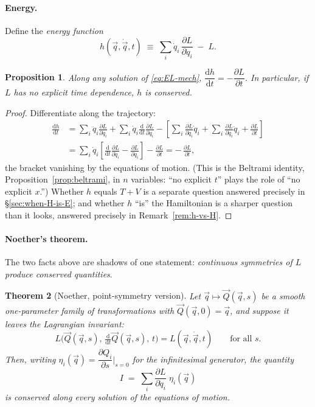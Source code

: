 \documentclass[11pt]{article}
\theoremstyle{plain}
\newtheorem{theorem}{Theorem}[section]
\newtheorem{proposition}[theorem]{Proposition}
\theoremstyle{definition}
\theoremstyle{remark}
\newcommand{\dd}{\mathrm{d}}
\newcommand{\pd}[2]{\frac{\partial #1}{\partial #2}}
\newcommand{\vq}{\vec{q}}
\begin{document}
\paragraph{Energy.}
Define the \emph{energy function}
\begin{equation}
  \boxed{\;
  h(\vq, \dot\vq, t) \;\equiv\; \sum_i \dot q_i\,\pd{L}{\dot q_i} \;-\; L .
  \;}
\end{equation}
\begin{proposition}\label{prop:energy}
Along any solution of \eqref{eq:EL-mech},
$\dfrac{\dd h}{\dd t} = -\dfrac{\partial L}{\partial t}$.
In particular, if $L$ has no explicit time dependence, $h$ is conserved.
\end{proposition}
\begin{proof}
Differentiate along the trajectory:
\begin{align}
  \frac{\dd h}{\dd t}
  &= \sum_i \ddot q_i \pd{L}{\dot q_i}
   + \sum_i \dot q_i \frac{\dd}{\dd t}\pd{L}{\dot q_i}
   - \left[\sum_i \pd{L}{q_i}\dot q_i
   + \sum_i \pd{L}{\dot q_i}\ddot q_i + \pd{L}{t}\right] \nonumber\\
  &= \sum_i \dot q_i\left[\frac{\dd}{\dd t}\pd{L}{\dot q_i}
     - \pd{L}{q_i}\right] - \pd{L}{t}
   = -\,\pd{L}{t},
\end{align}
the bracket vanishing by the equations of motion. (This is the Beltrami
identity, Proposition~\ref{prop:beltrami}, in $n$ variables: ``no explicit
$t$'' plays the role of ``no explicit $x$.'') Whether $h$ equals $T + V$
is a separate question answered precisely in \S\ref{sec:when-H-is-E};
and whether $h$ ``is'' the Hamiltonian is a sharper question than it
looks, answered precisely in Remark~\ref{rem:h-vs-H}.
\end{proof}

\paragraph{Noether's theorem.}
The two facts above are shadows of one statement: \emph{continuous
symmetries of $L$ produce conserved quantities}.

\begin{theorem}[Noether, point-symmetry version]\label{thm:noether}
Let $\vq \mapsto \vec Q(\vq, s)$ be a smooth one-parameter family of
transformations with $\vec Q(\vq, 0) = \vq$, and suppose it leaves the
Lagrangian invariant:
\begin{equation}
  L\bigl(\vec Q(\vq,s),\, \tfrac{\dd}{\dd t}\vec Q(\vq,s),\, t\bigr)
  = L(\vq, \dot\vq, t)
  \qquad\text{for all } s .
\end{equation}
Then, writing $\eta_i(\vq) = \dfrac{\partial Q_i}{\partial s}\Big|_{s=0}$
for the infinitesimal generator, the quantity
\begin{equation}
  \boxed{\;
  I \;=\; \sum_i \pd{L}{\dot q_i}\;\eta_i(\vq)
  \;}
\end{equation}
is conserved along every solution of the equations of motion.
\end{theorem}
\end{document}
